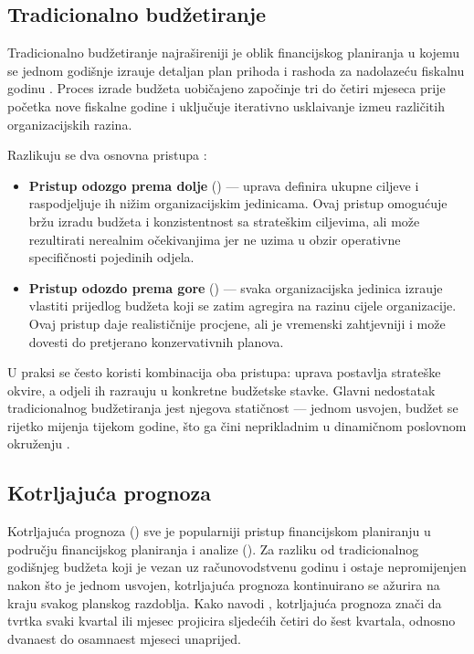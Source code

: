 \documentclass[zavrsnirad]{fer}
\begin{document}
\subsection{Tradicionalno bud\v{z}etiranje}
\label{subsec:budzetiranje}

Tradicionalno bud\v{z}etiranje najra\v{s}ireniji je oblik financijskog planiranja u kojemu se jednom godi\v{s}nje izra\dj uje detaljan plan prihoda i rashoda za nadolaze\'{c}u fiskalnu godinu \citep{horngren2015cost}. Proces izrade bud\v{z}eta uobi\v{c}ajeno zapo\v{c}inje tri do \v{c}etiri mjeseca prije po\v{c}etka nove fiskalne godine i uklju\v{c}uje iterativno uskla\dj ivanje izme\dj u razli\v{c}itih organizacijskih razina.

Razlikuju se dva osnovna pristupa \citep{horngren2015cost}:
\begin{itemize}
    \item \textbf{Pristup odozgo prema dolje} () --- uprava definira ukupne ciljeve i raspodjeljuje ih ni\v{z}im organizacijskim jedinicama. Ovaj pristup omogu\'{c}uje br\v{z}u izradu bud\v{z}eta i konzistentnost sa strate\v{s}kim ciljevima, ali mo\v{z}e rezultirati nerealnim o\v{c}ekivanjima jer ne uzima u obzir operativne specifi\v{c}nosti pojedinih odjela.
    \item \textbf{Pristup odozdo prema gore} () --- svaka organizacijska jedinica izra\dj uje vlastiti prijedlog bud\v{z}eta koji se zatim agregira na razinu cijele organizacije. Ovaj pristup daje realisti\v{c}nije procjene, ali je vremenski zahtjevniji i mo\v{z}e dovesti do pretjerano konzervativnih planova.
\end{itemize}

U praksi se \v{c}esto koristi kombinacija oba pristupa: uprava postavlja strate\v{s}ke okvire, a odjeli ih razra\dj uju u konkretne bud\v{z}etske stavke. Glavni nedostatak tradicionalnog bud\v{z}etiranja jest njegova stati\v{c}nost --- jednom usvojen, bud\v{z}et se rijetko mijenja tijekom godine, \v{s}to ga \v{c}ini neprikladnim u dinami\v{c}nom poslovnom okru\v{z}enju \citep{brealey2020principles}.

\subsection{Kotrljaju\'{c}a prognoza}
\label{subsec:rolling_forecast}

Kotrljaju\'{c}a prognoza () sve je popularniji pristup financijskom planiranju u podru\v{c}ju financijskog planiranja i analize (). Za razliku od tradicionalnog godi\v{s}njeg bud\v{z}eta koji je vezan uz ra\v{c}unovodstvenu godinu i ostaje nepromijenjen nakon \v{s}to je jednom usvojen, kotrljaju\'{c}a prognoza kontinuirano se a\v{z}urira na kraju svakog planskog razdoblja. Kako navodi \cite{melnychuk2019rolling}, kotrljaju\'{c}a prognoza zna\v{c}i da tvrtka svaki kvartal ili mjesec projicira sljede\'{c}ih \v{c}etiri do \v{s}est kvartala, odnosno dvanaest do osamnaest mjeseci unaprijed.
\end{document}
